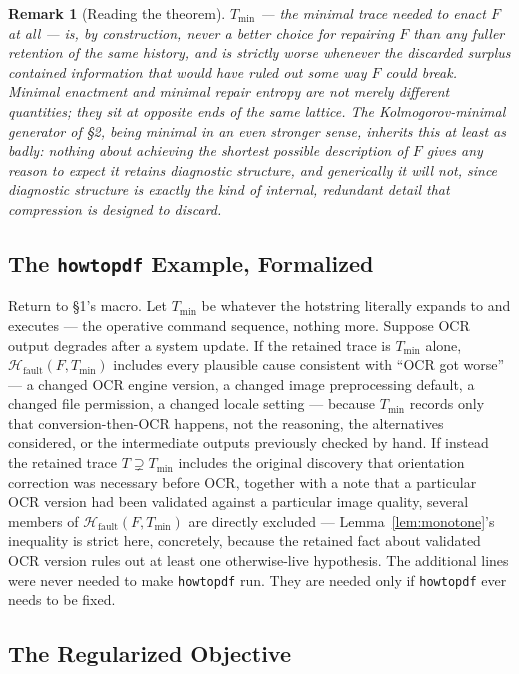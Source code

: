 \documentclass[11pt]{article}
\newtheorem*{remark}{Remark}
\begin{document}
\begin{remark}[Reading the theorem]
$T_{\min}$ — the minimal trace needed to \emph{enact} $F$ at all — is, by construction, never a better choice for \emph{repairing} $F$ than any fuller retention of the same history, and is strictly worse whenever the discarded surplus contained information that would have ruled out some way $F$ could break. Minimal enactment and minimal repair entropy are not merely different quantities; they sit at opposite ends of the same lattice. The Kolmogorov-minimal generator of \S 2, being minimal in an even stronger sense, inherits this at least as badly: nothing about achieving the shortest possible description of $F$ gives any reason to expect it retains diagnostic structure, and generically it will not, since diagnostic structure is exactly the kind of internal, redundant detail that compression is designed to discard.
\end{remark}

\subsection{The \texttt{howtopdf} Example, Formalized}

Return to \S 1's macro. Let $T_{\min}$ be whatever the hotstring literally expands to and executes — the operative command sequence, nothing more. Suppose OCR output degrades after a system update. If the retained trace is $T_{\min}$ alone, $\mathcal{H}_{\mathrm{fault}}(F,T_{\min})$ includes every plausible cause consistent with ``OCR got worse'' — a changed OCR engine version, a changed image preprocessing default, a changed file permission, a changed locale setting — because $T_{\min}$ records only that conversion-then-OCR happens, not the reasoning, the alternatives considered, or the intermediate outputs previously checked by hand. If instead the retained trace $T\supsetneq T_{\min}$ includes the original discovery that orientation correction was necessary before OCR, together with a note that a particular OCR version had been validated against a particular image quality, several members of $\mathcal{H}_{\mathrm{fault}}(F,T_{\min})$ are directly excluded — Lemma~\ref{lem:monotone}'s inequality is strict here, concretely, because the retained fact about validated OCR version rules out at least one otherwise-live hypothesis. The additional lines were never needed to make \texttt{howtopdf} run. They are needed only if \texttt{howtopdf} ever needs to be fixed.

\subsection{The Regularized Objective}
\end{document}
